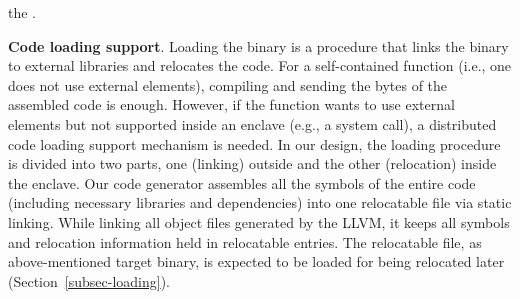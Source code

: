\DIFaddend the \DIFdelbegin {}\DIFdelend \DIFaddbegin {}\DIFaddend .


\vspace{3pt}\noindent\textbf{Code loading support}.\label{subsec:code-loading-support}
Loading the binary is a procedure that links the binary to external libraries and relocates the code. 
For a self-contained function (i.e., one does not use external elements), compiling and sending the bytes of the assembled code is enough. However, if the function wants to use external elements but not supported inside an enclave (e.g., a system call), a distributed code loading support mechanism is needed. In our design, the loading procedure is divided into two parts, one (linking) outside and the other (relocation) inside the enclave.
Our code generator assembles all the symbols of the entire code (including necessary libraries and dependencies) into one relocatable file via static linking. While linking all object files generated by the LLVM, it keeps all symbols and relocation information held in relocatable entries. 
The relocatable file, as above-mentioned target binary, is expected to be loaded for being relocated later (Section~\ref{subsec-loading}).



